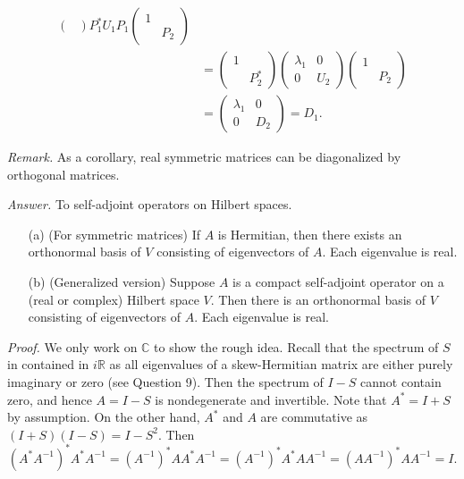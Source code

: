 \documentclass{mathproblems}
\newcommand\R{\mathbb{R}}
\newcommand\C{\mathbb{C}}
\begin{document}
\begin{questions}
$$\begin{aligned}
\begin{pmatrix}
\end{pmatrix} P_1^* U_1 P_1\begin{pmatrix}
1 & \\
& P_2
\end{pmatrix} \\
&=\begin{pmatrix}
1 & \\
& P_2^*
\end{pmatrix}\begin{pmatrix}
\lambda_1 & 0 \\
0 & U_2
\end{pmatrix}\begin{pmatrix}
1 & \\
& P_2
\end{pmatrix} \\
&=\begin{pmatrix}
\lambda_1 & 0 \\
0 & D_2
\end{pmatrix}=D_1.
\end{aligned}
$$


\textit{Remark.} As a corollary, real symmetric matrices can be diagonalized by orthogonal matrices. 




\textit{Answer.} To self-adjoint operators on Hilbert spaces. \vspace{-4pt}
\begin{itemize}
\item [(a)] (For symmetric matrices) If $A$ is Hermitian, then there exists an orthonormal basis of $V$ consisting of eigenvectors of $A$. Each eigenvalue is real.
\item [(b)] (Generalized version) Suppose $A$ is a compact self-adjoint operator on a (real or complex) Hilbert space $V$. Then there is an orthonormal basis of $V$ consisting of eigenvectors of $A$. Each eigenvalue is real.
\end{itemize}



\textit{Proof.} We only work on $\C$ to show the rough idea. Recall that the spectrum of $S$ in contained in $i\R$ as all eigenvalues of a skew-Hermitian matrix are either purely imaginary or zero (see Question 9). Then the spectrum of $I-S$ cannot contain zero, and hence $A=I-S$ is nondegenerate and invertible. Note that $A^*=I+S$ by assumption. On the other hand, $A^*$ and $A$ are commutative as $(I+S)(I-S)=I-S^2$. Then
$$
(A^*A^{-1})^* A^*A^{-1}=(A^{-1})^* A A^* A^{-1}=(A^{-1})^* A^* A A^{-1}=(AA^{-1})^* AA^{-1}=I.
$$


\end{questions}
\end{document}
